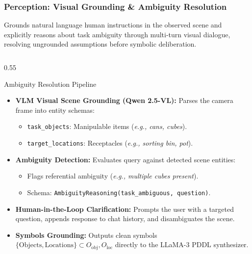 \documentclass[10pt]{beamer}
\begin{document}
\begin{frame}[t]
\frametitle{Perception: Visual Grounding \& Ambiguity Resolution}
\footnotesize
Grounds natural language human instructions in the observed scene and explicitly reasons about task ambiguity through multi-turn visual dialogue, resolving ungrounded assumptions before symbolic deliberation.

\vspace{0.1cm}
\begin{columns}[T]
    \begin{column}{0.55\textwidth}
        \begin{block}{Ambiguity Resolution Pipeline}
            \begin{itemize}\scriptsize
                \item \textbf{VLM Visual Scene Grounding (Qwen 2.5-VL):}
                Parses the camera frame into entity schemas:
                \begin{itemize}\tiny
                    \item \texttt{task\_objects}: Manipulable items (\textit{e.g., cans, cubes}).
                    \item \texttt{target\_locations}: Receptacles (\textit{e.g., sorting bin, pot}).
                \end{itemize}
                
                \item \textbf{Ambiguity Detection:}
                Evaluates query against detected scene entities:
                \begin{itemize}\tiny
                    \item Flags referential ambiguity (\textit{e.g., multiple cubes present}).
                    \item Schema: \texttt{AmbiguityReasoning(task\_ambiguous, question)}.
                \end{itemize}

                \item \textbf{Human-in-the-Loop Clarification:}
                Prompts the user with a targeted question, appends response to chat history, and disambiguates the scene.

                \item \textbf{Symbols Grounding:}
                Outputs clean symbols $\{\text{Objects}, \text{Locations}\} \subset O_{\text{obj}}, O_{\text{loc}}$ directly to the LLaMA-3 PDDL synthesizer.
            \end{itemize}
        \end{block}
    \end{column}


\end{columns}
\end{frame}
\end{document}
